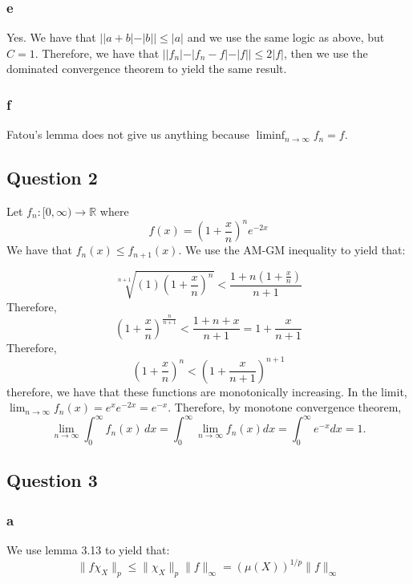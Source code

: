 \documentclass{article}
\theoremstyle{definition}
\numberwithin{theorem}{section}
\numberwithin{equation}{section}
\begin{document}
\subsubsection*{e}
Yes. We have that $| |a + b| - |b|| \leq |a|$ and we use the same logic as above, but $C = 1$. Therefore, we have that $||f_n| - |f_n - f| - |f|| \leq 2 |f|$, then we use the dominated convergence theorem to yield the same result.
\subsubsection*{f}
Fatou's lemma does not give us anything because $\liminf_{n \rightarrow \infty} f_n = f$. 
\subsection*{Question 2}

Let $f_n : [0, \infty) \rightarrow \mathbb{R}$ where
\begin{equation}
	f(x) = \left( 1 + \frac{x}{n}\right)^n e^{-2x}
\end{equation}
We have that $f_n(x) \leq f_{n+1}(x)$. We use the AM-GM inequality to yield that:

\begin{equation}
	\sqrt[n + 1]{(1) \left( 1 + \frac{x}{n}\right)^n} < \frac{1 + n \left( 1 + \frac{x}{n}\right)}{n + 1}
\end{equation}
Therefore,
\begin{equation}
	\left( 1 + \frac{x}{n}\right)^{\frac{n}{n + 1}} < \frac{1 + n + x}{n + 1} = 1 + \frac{x}{n + 1}
\end{equation}
Therefore,
\begin{equation}
	\left( 1 + \frac{x}{n}\right)^n < \left( 1 + \frac{x}{n+1}\right)^{n + 1}
\end{equation}
therefore, we have that these functions are monotonically increasing. In the limit,
$\lim_{n \rightarrow \infty} f_n(x) = e^{x} e^{-2x} = e^{-x}$. 
Therefore, by monotone convergence theorem,
\begin{equation}
	\lim_{n \rightarrow \infty} \int_{0}^\infty f_n(x) \, dx = \int_{0}^\infty \lim_{n \rightarrow \infty} f_n(x) dx = \int_{0}^\infty e^{-x} dx = 1. 
\end{equation}
\subsection*{Question 3}
\subsubsection*{a}
We use lemma 3.13 to yield that:
\begin{equation}
	\| f \chi_X \|_p \leq \| \chi_X \|_p \|f \|_\infty = (\mu(X))^{1/p} \|f \|_{\infty}
\end{equation}
\end{document}
